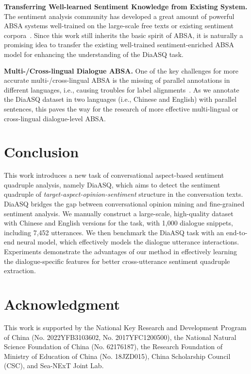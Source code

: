 \documentclass[11pt]{article}
\begin{document}
\vspace{4pt}
\noindent \textbf{Transferring Well-learned Sentiment Knowledge from Existing System.}
The sentiment analysis community has developed a great amount of powerful ABSA systems well-trained on the large-scale free texts or existing sentiment corpora~\cite{XuSYL20,TianGXLHWWW20,LiZZZW21}.
Since this work still inherits the basic spirit of ABSA, it is naturally a promising idea to transfer the existing well-trained sentiment-enriched ABSA model for enhancing the understanding of the DiaASQ task.

\vspace{4pt}
\noindent \textbf{Multi-/Cross-lingual Dialogue ABSA.}
One of the key challenges for more accurate multi-/cross-lingual ABSA is the missing of parallel annotations in different languages, i.e., causing troubles for label alignments~\cite{feng-wan-2019-learning,fei-li-2020-cross,zhang-etal-2021-cross}.
As we annotate the DiaASQ dataset in two languages (i.e., Chinese and English) with parallel sentences, this paves the way for the research of more effective multi-lingual or cross-lingual dialogue-level ABSA.

\vspace{-2mm}
\section{Conclusion} 

\vspace{-1mm}
This work introduces a new task of conversational aspect-based sentiment quadruple analysis, namely DiaASQ, which aims to detect the sentiment quadruple of \emph{target-aspect-opinion-sentiment} structure in the conversation texts.
DiaASQ bridges the gap between conversational opinion mining and fine-grained sentiment analysis.
We manually construct a large-scale, high-quality dataset with Chinese and English versions for the task, with 1,000 dialogue snippets, including 7,452 utterances.
We then benchmark the DiaASQ task with an end-to-end neural model, which effectively models the dialogue utterance interactions.
Experiments demonstrate the advantages of our method in effectively learning the dialogue-specific features for better cross-utterance sentiment quadruple extraction.

\section*{Acknowledgment}
This work is supported by 
the National Key Research and Development Program of China (No. 2022YFB3103602, No. 2017YFC1200500),
the National Natural Science Foundation of China (No. 62176187),
the Research Foundation of Ministry of Education of China (No. 18JZD015),
China Scholarship Council (CSC),
and Sea-NExT Joint Lab.
\end{document}
